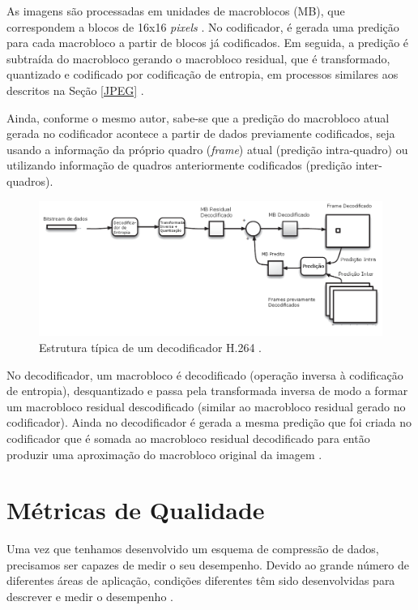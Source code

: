As imagens são processadas em unidades de macroblocos (MB), que correspondem a blocos de 16x16 \textit{pixels} \cite{richardson2011h}. No codificador, é gerada uma predição para cada macrobloco a partir de blocos já codificados. Em seguida, a predição é subtraída do macrobloco gerando o macrobloco residual, que é transformado, quantizado e codificado por codificação de entropia, em processos similares aos descritos na Seção \ref{JPEG} .

Ainda, conforme o mesmo autor, sabe-se que a predição do macrobloco atual gerada no codificador acontece a partir de dados previamente codificados, seja usando a informação da próprio quadro (\textit{frame}) atual (predição intra-quadro) ou utilizando informação de quadros anteriormente codificados (predição inter-quadros).
  
\begin{figure}[h]
	\centering
	\includegraphics[scale=0.45]{figuras/H264_DECODIFICADOR.png}
	\caption{Estrutura típica de um decodificador H.264 \cite{richardson2011h}.}
	\label{H264_DECODER}
\end{figure}

No decodificador, um macrobloco é decodificado (operação inversa à codificação de entropia), desquantizado e passa pela transformada inversa de modo a formar um macrobloco residual descodificado (similar ao macrobloco residual gerado no codificador). Ainda no decodificador é gerada a mesma predição que foi criada no codificador que é somada ao macrobloco residual decodificado para então produzir uma aproximação do macrobloco original da imagem \cite{richardson2011h}.

\section{Métricas de Qualidade}
\label{metricas}
Uma vez que tenhamos desenvolvido um esquema de compressão de dados, precisamos ser capazes de medir o seu desempenho. Devido ao grande número de diferentes áreas de aplicação, condições diferentes têm sido desenvolvidas para descrever e medir o desempenho \cite{sayood2012introduction}.

